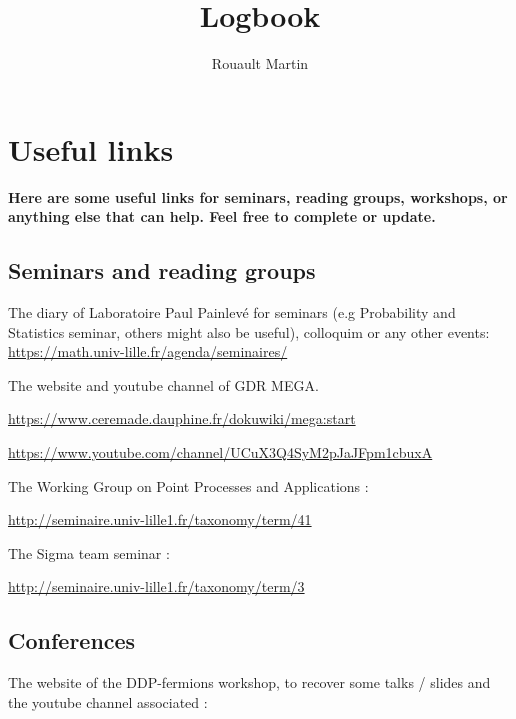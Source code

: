 \documentclass[a4paper,12pt]{report}
\title{Logbook}
\author{Rouault Martin}
\begin{document}
\maketitle

\chapter{Useful links}

\textbf{Here are some useful links for seminars, reading groups, workshops, or anything else that can help. Feel free to complete or update.}
\vspace{0.5cm}

\section{Seminars and reading groups}

The diary of Laboratoire Paul Painlevé for seminars (e.g Probability and Statistics seminar, others might also be useful), colloquim or any other events: \href{https://math.univ-lille.fr/agenda/seminaires/}{https://math.univ-lille.fr/agenda/seminaires/}
\vspace{0.5cm}

The website and youtube channel of GDR MEGA. 

\href{https://www.ceremade.dauphine.fr/dokuwiki/mega:start}{https://www.ceremade.dauphine.fr/dokuwiki/mega:start}

\href{https://www.youtube.com/channel/UCuX3Q4SyM2pJaJFpm1cbuxA}{https://www.youtube.com/channel/UCuX3Q4SyM2pJaJFpm1cbuxA}
\vspace{0.5cm}

The Working Group on Point Processes and Applications : 

\href{http://seminaire.univ-lille1.fr/taxonomy/term/41}{http://seminaire.univ-lille1.fr/taxonomy/term/41}
\vspace{0.5cm}

The Sigma team seminar :

\href{http://seminaire.univ-lille1.fr/taxonomy/term/3}{http://seminaire.univ-lille1.fr/taxonomy/term/3}

\section{Conferences}

The website of the DDP-fermions workshop, to recover some talks / slides and the youtube channel associated : 
\end{document}
